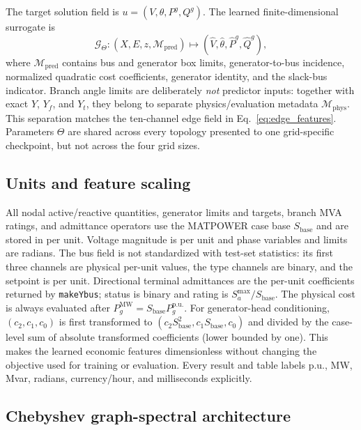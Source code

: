 \documentclass[final,5p,times,twocolumn]{elsarticle}
\begin{document}
The target solution field is
$u=(V,\theta,P^g,Q^g)$. The learned finite-dimensional surrogate is
\begin{equation}
  \mathcal{G}_{\Theta}:
  (X,E,z,\mathcal{M}_{\mathrm{pred}})
  \longmapsto
  (\widehat V,\widehat\theta,\widehat P^g,\widehat Q^g),
  \label{eq:operator}
\end{equation}
where $\mathcal{M}_{\mathrm{pred}}$ contains bus and generator box limits,
generator-to-bus incidence, normalized quadratic cost coefficients, generator
identity, and the slack-bus indicator. Branch angle limits are deliberately
\emph{not} predictor inputs: together with exact $Y$, $Y_f$, and $Y_t$, they
belong to separate physics/evaluation metadata
$\mathcal{M}_{\mathrm{phys}}$. This separation matches the ten-channel edge
field in Eq.~\eqref{eq:edge_features}. Parameters $\Theta$ are shared across
every topology presented to one grid-specific checkpoint, but not across the
four grid sizes.

\subsection{Units and feature scaling}

All nodal active/reactive quantities, generator limits and targets, branch MVA
ratings, and admittance operators use the MATPOWER case base
$S_{\mathrm{base}}$ and are stored in per unit. Voltage magnitude is per unit
and phase variables and limits are radians. The bus field is not standardized
with test-set statistics: its first three channels are physical per-unit
values, the type channels are binary, and the setpoint is per unit. Directional
terminal admittances are the per-unit coefficients returned by
\texttt{makeYbus}; status is binary and rating is $S_a^{\max}/S_{\mathrm{base}}$.
The physical cost is always evaluated after
$P_g^{\mathrm{MW}}=S_{\mathrm{base}}P_g^{\mathrm{p.u.}}$. For generator-head
conditioning, $(c_2,c_1,c_0)$ is first transformed to
$(c_2S_{\mathrm{base}}^2,c_1S_{\mathrm{base}},c_0)$ and divided by the
case-level sum of absolute transformed coefficients (lower bounded by one).
This makes the learned economic features dimensionless without changing the
objective used for training or evaluation. Every result and table labels p.u.,
MW, Mvar, radians, currency/hour, and milliseconds explicitly.

\subsection{Chebyshev graph-spectral architecture}
\label{subsec:gfno}
\end{document}
